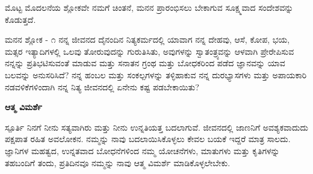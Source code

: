 ಮೊಟ್ಟ ಮೊದಲನೆಯ ಶ್ಲೋಕವೇ ನಮಗೆ ಚಿಂತನೆ, ಮನನ ಪ್ರಾರಂಭಿಸಲು ಬೇಕಾಗುವ ಸೂಕ್ಷ್ಮವಾದ ಸಂದೇಶವನ್ನು ಕೊಡುತ್ತದೆ.\\

\newpage
\begin{mananam}{\mananamfont ಮನನ ಶ್ಲೋಕ - \textenglish{೧}}
{\footnotesize \mananamtext ನನ್ನ ಜೀವನದ ದೈನಂದಿನ ನಿತ್ಯಕರ್ಮದಲ್ಲಿ ಯಾವಾಗ ನನ್ನ ದೇಹವು, ಆಸೆ, ಕೋಪ, ಭಯ, ಮತ್ಸರ ಇತ್ಯಾದಿಗಳಲ್ಲಿ ಒಲವು ತೋರುವುದನ್ನು ಗುರುತಿಸಿತು, ಅವುಗಳನ್ನು ಸ್ವಾತಂತ್ರ್ಯವನ್ನು ಆಳವಾಗಿ ಪ್ರೇರೇಪಿಸುವ ನನ್ನನ್ನು ಪ್ರತಿಭಟಿಸುವಂತೆ ಮಾಡುವ ಮತ್ತು ಸನಾತನ ಗ್ರಂಥ ಮತ್ತು ಬೋಧಕರಿಂದ ಪಡೆದ ಜ್ಞಾನವನ್ನು ಯಾವ ಬಲವನ್ನು ಅನುಸರಿಸಿದೆ? ನನ್ನ ಹಂಬಲ ಮತ್ತು ಸಂಕಲ್ಪಗಳನ್ನು ತಳ್ಳಿಹಾಕುವ ನನ್ನ ದುರಭ್ಯಾಸಗಳು ಮತ್ತು ಅಪಾಯಕಾರಿ ನಡವಳಿಕೆಗಳಿಂದಾಗಿ ನನ್ನ ನಿತ್ಯ ಜೀವನದಲ್ಲಿ ಏನೇನು ಕಷ್ಟ ಪಡಬೇಕಾಯಿತು?}
\end{mananam}
\WritingHand\enspace\textbf{ಆತ್ಮ ವಿಮರ್ಶೆ}
\begin{inspiration}{\mananamfont ಸ್ಪೂರ್ತಿ}
{\footnotesize \mananamtext ನಿನಗೆ ನೀನು ಸತ್ಯವಾಗಿರು ಮತ್ತು ನೀನು ಉನ್ನತಿಯತ್ತ ಬದಲಾಗುವೆ. ಜೀವನದಲ್ಲಿ ಜಾಣನಿಗೆ ಅವಶ್ಯಕವಾದುದು ಪಕ್ಷಪಾತ ರಹಿತ ಅವಲೋಕನ. ನಮ್ಮನ್ನು ನಾವು ಬದಲಾಯಿಸಿಕೊಳ್ಳಲು ಕೇವಲ ಬಯಕೆ ಇದ್ದರೆ ಮಾತ್ರ ಸಾಲದು. ಜ್ಞಾನಿಗಳ ಮಹತ್ವದ, ಉನ್ನತವಾದ ಬೋಧನೆಗಳಿಂದ ನಮ್ಮ ಯೋಚನೆಗಳು, ಮಾತುಗಳು ಮತ್ತು ಕೃತಿಗಳನ್ನು ತಹಬಂದಿಗೆ ತಂದು, ಪ್ರತಿದಿನವೂ ನಮ್ಮನ್ನು ನಾವು ಆತ್ಮ ವಿಮರ್ಶೆ ಮಾಡಿಕೊಳ್ಳಲೇಬೇಕು.}
\end{inspiration}
\newpage

